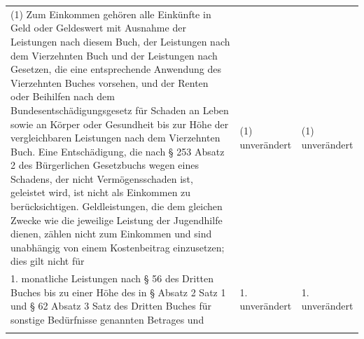 \documentclass[10pt,a4paper,landscape]{article}
\begin{document}
\begin{longtable}{|L{8.2cm}|L{8.2cm}|L{8.2cm}|}
(1) Zum Einkommen gehören alle Einkünfte  \newline in Geld oder Geldeswert mit Ausnahme der  \newline Leistungen nach diesem Buch, der  \newline Leistungen nach dem Vierzehnten Buch  \newline und der Leistungen nach Gesetzen, die  \newline eine entsprechende Anwendung des  \newline Vierzehnten Buches vorsehen, und der  \newline Renten oder Beihilfen nach dem  \newline Bundesentschädigungsgesetz für Schaden  \newline an Leben sowie an Körper oder  \newline Gesundheit bis zur Höhe der  \newline vergleichbaren Leistungen nach dem  \newline Vierzehnten Buch. Eine Entschädigung, die  \newline nach \S{} 253 Absatz 2 des Bürgerlichen  \newline Gesetzbuchs wegen eines Schadens, der  \newline nicht Vermögensschaden ist, geleistet wird,  \newline ist nicht als Einkommen zu  \newline berücksichtigen. Geldleistungen, die dem  \newline gleichen Zwecke wie die jeweilige Leistung  \newline der Jugendhilfe dienen, zählen nicht zum  \newline Einkommen und sind unabhängig von  \newline einem Kostenbeitrag einzusetzen; dies gilt  \newline nicht für & (1) unverändert & (1) unverändert \\
\hhline{|---|}
1.   \newline monatliche Leistungen nach \S{} 56 des  \newline Dritten Buches bis zu einer Höhe des in \S{}   Absatz 2 Satz 1 und \S{} 62 Absatz 3 Satz   des Dritten Buches für sonstige  \newline Bedürfnisse genannten Betrages und & 1. unverändert & 1. unverändert \\
\hhline{|---|}

\end{longtable}
\end{document}
